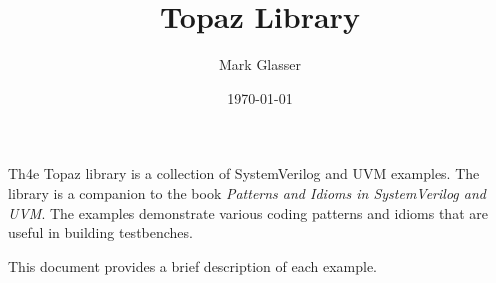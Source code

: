 \documentclass{article}
\begin{document}
\title{Topaz Library}
\author{Mark Glasser}
\date{\today}
\maketitle

Th4e Topaz library is a collection of SystemVerilog and UVM examples.
The library is a companion to the book \emph{Patterns and Idioms in
SystemVerilog and UVM}.  The examples demonstrate various coding
patterns and idioms that are useful in building testbenches.

This document provides a brief description of each example.
\end{document}
